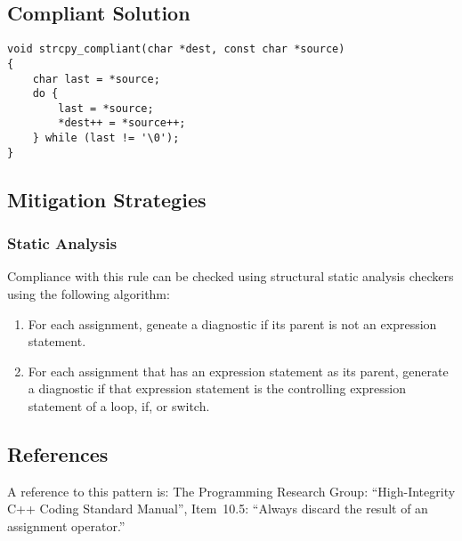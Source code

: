 \subsection{Compliant Solution}

\begin{verbatim}
void strcpy_compliant(char *dest, const char *source)
{
    char last = *source;
    do {
        last = *source;
        *dest++ = *source++;
    } while (last != '\0');
}
\end{verbatim}

\subsection{Mitigation Strategies}
\subsubsection{Static Analysis} 

Compliance with this rule can be checked using structural static analysis checkers using the following algorithm:

\begin{enumerate}
\item For each assignment, geneate a diagnostic if its parent is not an expression statement.
\item For each assignment that has an expression statement as its parent, generate a diagnostic if that expression
statement is the controlling expression statement of a loop, if, or switch.
\end{enumerate}

\subsection{References}

A reference to this pattern is: The Programming Research Group:
``High-Integrity C++ Coding Standard Manual'', Item~10.5: ``Always discard the
result of an assignment operator.''

